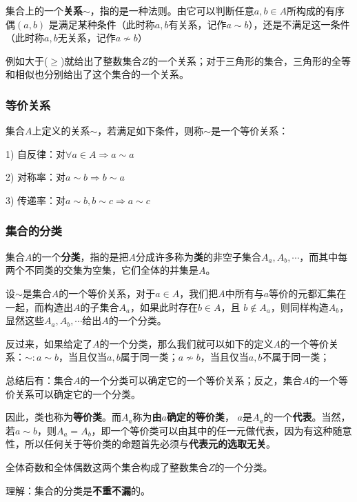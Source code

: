\documentclass[12pt]{article}
\begin{document}
集合上的一个\textbf{关系$\sim$}，指的是一种法则。由它可以判断任意$a,b\in A$所构成的有序偶$(a,b)$ 是满足某种条件（此时称$a,b$有关系，记作$a\sim b$），还是不满足这一条件（此时称$a,b$无关系，记作$a\nsim b$）

\begin{framed}
\small {
例如大于($\ge$)就给出了整数集合$Z$的一个关系；对于三角形的集合，三角形的全等和相似也分别给出了这个集合的一个关系。
}
\end{framed}

\subsubsection{等价关系}
集合$A$上定义的关系$\sim$，若满足如下条件，则称$\sim$是一个等价关系：

1) 自反律：对$\forall a \in A \Rightarrow a \sim a$

2) 对称率：对$a \sim b \Rightarrow b \sim a$

3) 传递率：对$a \sim b, b \sim c\Rightarrow a \sim c$

\subsubsection{集合的分类}
集合$A$的一个\textbf{分类}，指的是把$A$分成许多称为\textbf{类}的非空子集合$A_a, A_b, \cdots $，而其中每两个不同类的交集为空集，它们全体的并集是$A$。

设$\sim$是集合$A$的一个等价关系，对于$a\in A$，我们把$A$中所有与$a$等价的元都汇集在一起，而构造出$A$的子集合$A_a$，如果此时存在$b \in A$，且 $b \notin A_a$，则同样构造$A_b$，显然这些$A_a, A_b, \cdots $给出$A$的一个分类。

反过来，如果给定了$A$的一个分类，那么我们就可以如下的定义$A$的一个等价关系：$\sim: a \sim b$，当且仅当$a,b$属于同一类；$a \nsim b$，当且仅当$a,b$不属于同一类；

总结后有：集合$A$的一个分类可以确定它的一个等价关系；反之，集合$A$的一个等价关系可以确定它的一个分类。

因此，类也称为\textbf{等价类}。而$A_a$称为\textbf{由$a$确定的等价类}， $a$是$A_a$的一个\textbf{代表}。当然，若$a \sim b$，则$A_a = A_b$，即一个等价类可以由其中的任一元做代表，因为有这种随意性，所以任何关于等价类的命题首先必须与\textbf{代表元的选取无关}。

\begin{framed}
\small {
全体奇数和全体偶数这两个集合构成了整数集合$Z$的一个分类。

理解：集合的分类是\textbf{不重不漏}的。
}
\end{framed}
\end{document}
